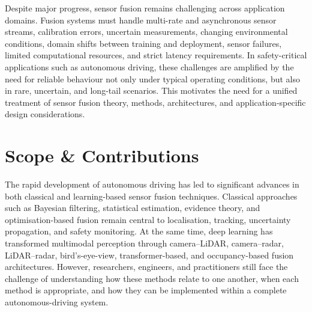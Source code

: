 Despite major progress, sensor fusion remains challenging across application domains. Fusion systems must handle multi-rate and asynchronous sensor streams, calibration errors, uncertain measurements, changing environmental conditions, domain shifts between training and deployment, sensor failures, limited computational resources, and strict latency requirements. In safety-critical applications such as autonomous driving, these challenges are amplified by the need for reliable behaviour not only under typical operating conditions, but also in rare, uncertain, and long-tail scenarios. This motivates the need for a unified treatment of sensor fusion theory, methods, architectures, and application-specific design considerations.

\section{Scope \& Contributions}

The rapid development of autonomous driving has led to significant advances in both classical and learning-based sensor fusion techniques. Classical approaches such as Bayesian filtering, statistical estimation, evidence theory, and optimisation-based fusion remain central to localisation, tracking, uncertainty propagation, and safety monitoring. At the same time, deep learning has transformed multimodal perception through camera--LiDAR, camera--radar, LiDAR--radar, bird's-eye-view, transformer-based, and occupancy-based fusion architectures. However, researchers, engineers, and practitioners still face the challenge of understanding how these methods relate to one another, when each method is appropriate, and how they can be implemented within a complete autonomous-driving system.


